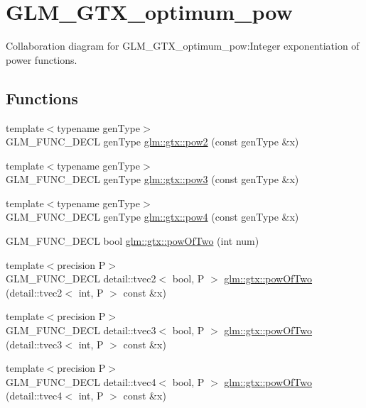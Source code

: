 \hypertarget{group__gtx__optimum__pow}{
\section{GLM\_\-GTX\_\-optimum\_\-pow}
\label{group__gtx__optimum__pow}
}


Collaboration diagram for GLM\_\-GTX\_\-optimum\_\-pow:Integer exponentiation of power functions.  
\subsection*{Functions}
\begin{CompactItemize}
\item 
{\footnotesize template$<$typename genType$>$ }\\GLM\_\-FUNC\_\-DECL genType \hyperlink{group__gtx__optimum__pow_g8c44a36cd695f8abc2444152606f6067}{glm::gtx::pow2} (const genType \&x)
\item 
{\footnotesize template$<$typename genType$>$ }\\GLM\_\-FUNC\_\-DECL genType \hyperlink{group__gtx__optimum__pow_gc304ffcd456eeb248c1a3820cd9d7784}{glm::gtx::pow3} (const genType \&x)
\item 
{\footnotesize template$<$typename genType$>$ }\\GLM\_\-FUNC\_\-DECL genType \hyperlink{group__gtx__optimum__pow_g829e48dc50a8db13c225cef2aa618839}{glm::gtx::pow4} (const genType \&x)
\item 
GLM\_\-FUNC\_\-DECL bool \hyperlink{group__gtx__optimum__pow_g399b24df28267c1f061c462dd359affd}{glm::gtx::powOfTwo} (int num)
\item 
{\footnotesize template$<$precision P$>$ }\\GLM\_\-FUNC\_\-DECL detail::tvec2$<$ bool, P $>$ \hyperlink{group__gtx__optimum__pow_g9eb230332816fecf06fc3a6f01fcaffa}{glm::gtx::powOfTwo} (detail::tvec2$<$ int, P $>$ const \&x)
\item 
{\footnotesize template$<$precision P$>$ }\\GLM\_\-FUNC\_\-DECL detail::tvec3$<$ bool, P $>$ \hyperlink{group__gtx__optimum__pow_g9225089c241c18df4ff3548949f8d223}{glm::gtx::powOfTwo} (detail::tvec3$<$ int, P $>$ const \&x)
\item 
{\footnotesize template$<$precision P$>$ }\\GLM\_\-FUNC\_\-DECL detail::tvec4$<$ bool, P $>$ \hyperlink{group__gtx__optimum__pow_g6b8d2e72de216fdb517d7bcc9323a713}{glm::gtx::powOfTwo} (detail::tvec4$<$ int, P $>$ const \&x)
\end{CompactItemize}


